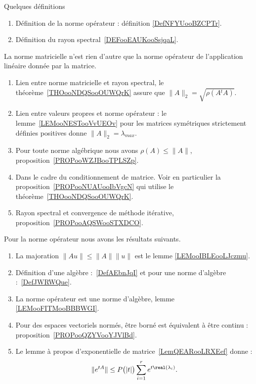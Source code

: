      \label{THEMEooOJJFooWMSAtL}

Quelques définitions
\begin{enumerate}
    \item
        Définition de la norme opérateur : définition \ref{DefNFYUooBZCPTr}.
    \item
        Définition du rayon spectral~\ref{DEFooEAUKooSsjqaL}.
\end{enumerate}

    La norme matricielle n'est rien d'autre que la norme opérateur de l'application linéaire donnée par la matrice.

    \begin{enumerate}
        \item
            Lien entre norme matricielle et rayon spectral, le théorème~\ref{THOooNDQSooOUWQrK} assure que $\|A\|_2=\sqrt{\rho(A{^t}A)}$.
        \item
            Lien entre valeurs propres et norme opérateur : le lemme~\ref{LEMooNESTooVvUEOv} pour les matrices symétriques strictement définies positives donne \( \| A \|_2=\lambda_{max}\).
        \item
            Pour toute norme algébrique nous avons \( \rho(A)\leq \| A \|\), proposition~\ref{PROPooWZJBooTPLSZp}.
        \item
            Dans le cadre du conditionnement de matrice. Voir en particulier la proposition~\ref{PROPooNUAUooIbVgcN} qui utilise le théorème~\ref{THOooNDQSooOUWQrK}.
        \item
            Rayon spectral et convergence de méthode itérative, proposition~\ref{PROPooAQSWooSTXDCO}.
    \end{enumerate}

    Pour la norme opérateur nous avons les résultats suivants.

    \begin{enumerate}
        \item
            La majoration \( \| Au \|\leq \| A \|\| u \|\) est le lemme \ref{LEMooIBLEooLJczmu}.
        \item
            Définition d'une algèbre :~\ref{DefAEbnJqI} et pour une norme d'algèbre :~\ref{DefJWRWQue}.
        \item
            La norme opérateur est une norme d'algèbre, lemme \ref{LEMooFITMooBBBWGI}.
        \item
            Pour des espaces vectoriels normés, être borné est équivalent à être continu : proposition~\ref{PROPooQZYVooYJVlBd}.
        \item
            Le lemme à propos d'exponentielle de matrice~\ref{LemQEARooLRXEef} donne :
            \begin{equation*}
                \|  e^{tA} \|\leq P\big( | t | \big)\sum_{i=1}^r e^{t\real(\lambda_i)}.
            \end{equation*}
    \end{enumerate}


